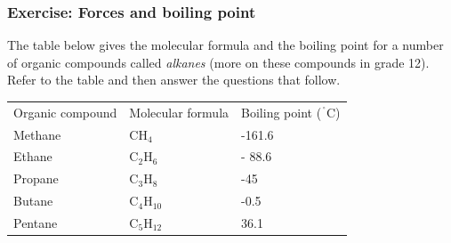             \subsubsection{ Exercise: Forces and boiling point }
            \nopagebreak
            \label{m38734*uid9732}The table below gives the molecular formula and the boiling point 
for a number of organic compounds called \textsl{alkanes} (more on these compounds in grade 12). Refer 
to the table and then answer the questions that follow.
          \begin{table}[H]
        \begin{center}
      \label{m38734*id309695}
    \noindent
      \tablelasttail{}
      \begin{xtabular}[t]{|l|l|l|}\hline
        Organic compound &
        Molecular 
formula &
        Boiling point (${}^{\ensuremath{{\,}^{\circ}}}\mathrm{C}$)%
     \tabularnewline{}
        Methane &
        ${\mathrm{CH}}_{4}$ &
        -161.6%
     \tabularnewline{}
        Ethane &
        ${\mathrm{C}}_{2}{\mathrm{H}}_{6}$ &
        -
88.6%
     \tabularnewline{}
        Propane &
        ${\mathrm{C}}_{3}{\mathrm{H}}_{8}$
 &
        -45%
     \tabularnewline{}
        Butane &
        ${\mathrm{C}}_{4}{\mathrm{H}}_{10}$ &
        -0.5%
     \tabularnewline{}
        Pentane &
        ${\mathrm{C}}_{5}{\mathrm{H}}_{12}$ &
        36.1%
     \tabularnewline{}

\end{xtabular}
\end{center}
\end{table}
